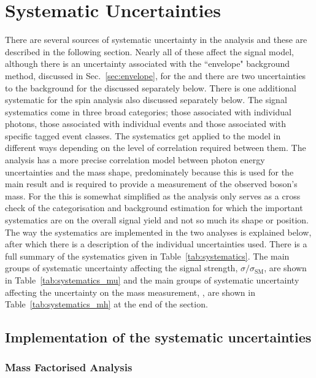 \section{Systematic Uncertainties}
\label{sec:systematics}

There are several sources of systematic uncertainty in the analysis and these are described in the following section. Nearly all of these affect the signal model, although there is an uncertainty associated with the ``envelope" background method, discussed in Sec.~\ref{sec:envelope}, for the \MFM and there are two uncertainties to the background for the \SMVA discussed separately below. There is one additional systematic for the spin analysis also discussed separately below. The signal systematics come in three broad categories; those associated with individual photons, those associated with individual events and those associated with specific tagged event classes. The systematics get applied to the model in different ways depending on the level of correlation required between them. The \MFM analysis has a more precise correlation model between photon energy uncertainties and the mass shape, predominately because this is used for the main result and is required to provide a measurement of the observed boson's mass. For the \SMVA this is somewhat simplified as the analysis only serves as a cross check of the categorisation and background estimation for which the important systematics are on the overall signal yield and not so much its shape or position. The way the systematics are implemented in the two analyses is explained below, after which there is a description of the individual uncertainties used. There is a full summary of the systematics given in Table~\ref{tab:systematics}. The main groups of systematic uncertainty affecting the signal strength, $\sigma/\sigma_{\mathrm{SM}}$, are shown in Table~\ref{tab:systematics_mu} and the main groups of systematic uncertainty affecting the uncertainty on the mass measurement, \mH, are shown in Table~\ref{tab:systematics_mh} at the end of the section.

\subsection{Implementation of the systematic uncertainties}

\subsubsection{Mass Factorised Analysis}

